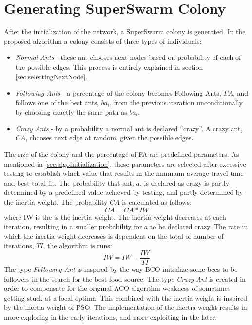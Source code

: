 \section{Generating SuperSwarm Colony}
\label{sec:algoGeneratingSuperSwarm}
After the initialization of the network, a SuperSwarm colony is generated. In the proposed algorithm a colony consists of three types of individuals:
\begin{itemize}
\item \textit{Normal Ants} - these ant chooses next nodes based on probability of each of the possible edges. This process is entirely explained in section \vref{sec:selectingNextNode}.
\item \textit{Following Ants} - a percentage of the colony becomes Following Ants, $FA$, and follows one of the best ants, $ba_i$, from the previous iteration unconditionally by choosing exactly the same path as $ba_i$.
\item \textit{Crazy Ants} - by a probability a normal ant is declared ``crazy''. A crazy ant, $CA$, chooses next edge at random, given the possible edges.  
\end{itemize}

The size of the colony and the percentage of FA are predefined parameters. As mentioned in \vref{sec:algoInitialization}, these parameters are selected after excessive testing to establish which value that results in the minimum average travel time and best total fit. The probability that ant, $a$, is declared as crazy is partly determined by a predefined value achieved by testing, and partly determined by the inertia weight. The probability $CA$ is calculated as follows: 
\newline
$$CA = CA*IW$$
\newline
where IW is the is the inertia weight. The inertia weight decreases at each iteration, resulting in a smaller probability for $a$ to be declared crazy. The rate in which the inertia weight decreases is dependent on the total of number of iterations, $TI$, the algorithm is runs:
\newline
$$IW = IW - \frac{IW}{TI}$$
\newline
The type \textit{Following Ant} is inspired by the way BCO initialize some bees to be followers in the search for the best food source. The type \textit{Crazy Ant} is created in order to compensate for the original ACO algorithm weakness of sometimes getting stuck at a local optima. This combined with the inertia weight is inspired by the inertia weight of PSO. The implementation of the inertia weight results in more exploring in the early iterations, and more exploiting in the later. 
